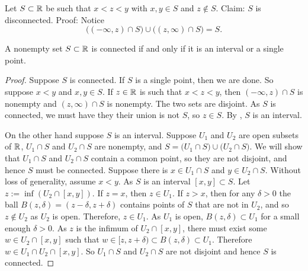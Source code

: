 \begin{example}
Let $S \subset {\mathbb{R}}$ be such that $x < z < y$ with $x,y \in S$
and $z \notin S$.  Claim: $S$ is disconnected.  Proof:  Notice
\begin{equation*}
\bigl( (-\infty,z) \cap S \bigr)
\cup
\bigl( (z,\infty) \cap S \bigr)
= S .
\end{equation*}
\end{example}

\begin{prop}
A nonempty set $S \subset {\mathbb{R}}$ is connected if and only if it is
an interval or a single point.
\end{prop}

\begin{proof}
Suppose $S$ is connected.  If $S$ is a single point,
then we are done.  So suppose $x < y$ and $x,y \in S$.  If $z \in {\mathbb{R}}$ is such
that $x < z < y$, then $(-\infty,z) \cap S$ is nonempty and $(z,\infty) \cap
S$ is nonempty.  The two sets are disjoint.  As
$S$ is connected, we must have they their union is not $S$, so $z \in S$.
By , $S$ is an interval.

%

On the other hand suppose $S$ is an interval.
Suppose $U_1$ and $U_2$ are open subsets of ${\mathbb{R}}$,
$U_1 \cap S$ and $U_2 \cap S$ are nonempty, and
$S = 
\bigl( U_1 \cap S \bigr)
\cup
\bigl( U_2 \cap S \bigr)$.  We will show that $U_1 \cap S$
and $U_2 \cap S$ contain a common point, so they are not disjoint,
and hence $S$ must be connected.
Suppose there is $x \in U_1 \cap S$
and $y \in U_2 \cap S$.  Without loss of generality, assume $x < y$.  As $S$ is an interval
$[x,y] \subset S$.  Let $z := \inf (U_2 \cap [x,y])$.
If $z = x$, then $z
\in U_1$.  If $z > x$,
then for any $\delta > 0$ the 
ball $B(z,\delta) =
(z-\delta,z+\delta)$ contains points of $S$ that are not
in $U_2$, and so $z \notin U_2$ as $U_2$ is open.
Therefore, $z \in U_1$.
As $U_1$ is open, $B(z,\delta) \subset U_1$ for a small enough $\delta >
0$.
As $z$ is the infimum of $U_2 \cap [x,y]$, 
there must exist some $w \in U_2 \cap [x,y]$
such that $w \in [z,z+\delta) \subset B(z,\delta) \subset U_1$.
Therefore $w \in U_1 \cap U_2 \cap [x,y]$.
So $U_1 \cap S$ and $U_2 \cap S$ are not disjoint and hence $S$ is connected.
\end{proof}


